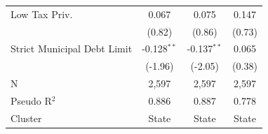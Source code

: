 \begin{tabular*}{\textwidth}{@{\extracolsep{\fill}}lccc}
   Low Tax Priv.               & 0.067             & 0.075                 & 0.147\\   
                               & (0.82)           & (0.86)               & (0.73)\\   
   Strict Municipal Debt Limit & -0.128$^{**}$     & -0.137$^{**}$         & 0.065\\   
                               & (-1.96)          & (-2.05)              & (0.38)\\   
   \hline
   N                & 2,597             & 2,597                 & 2,597\\  
   Pseudo R$^2$                & 0.886             & 0.887                 & 0.778\\  
   Cluster              & State & State & State\\  
   \bottomrule
\end{tabular*}
\par\endgroup
